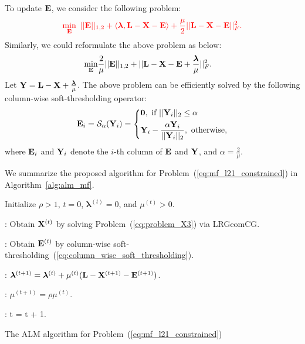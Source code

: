\documentclass[letterpaper]{article}
\def\bE{{\bf E}}
\def\blambda{{\bm \lambda}}
\def\calS{{\mathcal{S}}}
\def\bL{{\bf L}}
\def\bX{{\bf X}}
\def\bX{{\bf X}}
\def\bY{{\bf Y}}
\def\zerocolumn{{\bf 0}}
\def\yanred{\textcolor{red}}
\begin{document}
To update $\bE$, we consider the following problem:
\begin{align}\label{eq:problem_E}
  \yanred{
  \min_{\bE} ~ || \bE ||_{1,2} + \langle \blambda, \bL - \bX - \bE \rangle + \frac{\mu}{2} || \bL - \bX - \bE ||_F^2   .
  }
\end{align}
\noindent
Similarly, we could reformulate the above problem as below:
\begin{align}\label{eq:problem_E2}
  \min_{\bE} & \frac{2}{\mu} || \bE ||_{1,2} + || \bL - \bX - \bE + \frac{\blambda}{\mu} ||_F^2    .
\end{align}
\noindent
Let $\bY = \bL - \bX + \frac{\blambda}{\mu}$.
The above problem can be efficiently solved by the following column-wise soft-thresholding operator:
\begin{align}\label{eq:column_wise_soft_thresholding}
  \bE_{i} = \calS_{\alpha}(\bY_{i}) = \left\{
    \begin{aligned}
      & \zerocolumn,~\text{if}~ ||\bY_{i}||_2 \leq \alpha   \\
      & \bY_{i} - \frac{\alpha \bY_{i}}{|| \bY_{i} ||_2},~\text{otherwise,}
    \end{aligned}
    \right.
\end{align}
\noindent
where $\bE_{i}$ and $\bY_{i}$ denote the $i$-th column of $\bE$ and $\bY$,
and $\alpha = \frac{2}{\mu}$.



We summarize the proposed algorithm for Problem~(\ref{eq:mf_l21_constrained}) in Algorithm~\ref{alg:alm_mf}.
\begin{algorithm}[h!]
\begin{algorithmic}
\STATE Initialize $\rho > 1$, $t = 0$, $\blambda^{(t)} = 0$, and $\mu^{(t)} > 0$.



    : Obtain $\bX^{(t)}$ by solving Problem~(\ref{eq:problem_X3}) via LRGeomCG.

    : Obtain $\bE^{(t)}$ by column-wise soft-thresholding~(\ref{eq:column_wise_soft_thresholding}).

  \ENDWHILE

  : $\blambda^{(t+1)} = \blambda^{(t)} + \mu^{(t)} (\bL - \bX^{(t+1)} - \bE^{(t+1)})$.

  : $\mu^{(t+1)} = \rho \mu^{(t)}$.

  : t = t + 1.

\ENDWHILE

\end{algorithmic}
\caption{The ALM algorithm for Problem~(\ref{eq:mf_l21_constrained})}
\label{alg:alm_mf}
\end{algorithm}
\end{document}
